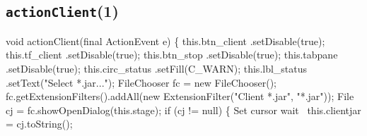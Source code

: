 \subsection{\texttt{actionClient}(1)}
\nwenddocs{}\endmoddef{}
void actionClient(final ActionEvent e) \{
  this.btn_client   .setDisable(true);
  this.tf_client    .setDisable(true);
  this.btn_stop     .setDisable(true);
  this.tabpane      .setDisable(true);
  this.circ_status  .setFill(C_WARN);
  this.lbl_status   .setText("Select *.jar...");
  FileChooser fc = new FileChooser();
  fc.getExtensionFilters().addAll(new ExtensionFilter("Client *.jar", "*.jar"));
  File cj = fc.showOpenDialog(this.stage);
  if (cj != null) \{
    \LA{}Set cursor wait~{\nwtagstyle{}}\RA{}
    this.clientjar = cj.toString();

